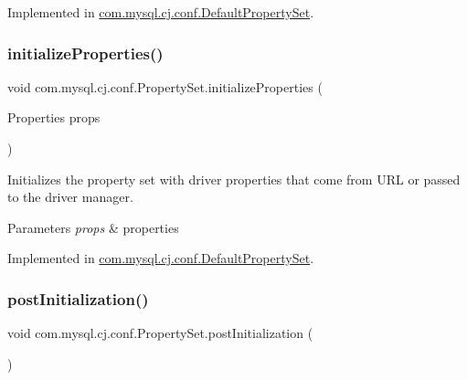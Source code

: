 Implemented in \mbox{\hyperlink{classcom_1_1mysql_1_1cj_1_1conf_1_1_default_property_set_a3eedd64227cd2e0ad94201c64992a259}{com.\+mysql.\+cj.\+conf.\+Default\+Property\+Set}}.

\mbox{\label{interfacecom_1_1mysql_1_1cj_1_1conf_1_1_property_set_a4d0959318c1dd50f8d73a4aabcacd2ae}} 
\subsubsection{\texorpdfstring{initialize\+Properties()}{initializeProperties()}}
{\footnotesize\ttfamily void com.\+mysql.\+cj.\+conf.\+Property\+Set.\+initialize\+Properties (\begin{DoxyParamCaption}\item[{Properties}]{props }\end{DoxyParamCaption})}

Initializes the property set with driver properties that come from U\+RL or passed to the driver manager.


\begin{DoxyParams}{Parameters}
{\em props} & properties \\
\hline
\end{DoxyParams}


Implemented in \mbox{\hyperlink{classcom_1_1mysql_1_1cj_1_1conf_1_1_default_property_set_aca8a98e7e0fa72d07fde37a0e7b03fbe}{com.\+mysql.\+cj.\+conf.\+Default\+Property\+Set}}.

\mbox{\label{interfacecom_1_1mysql_1_1cj_1_1conf_1_1_property_set_a1e590d8f29a11f3231099aa1c163f987}} 
\subsubsection{\texorpdfstring{post\+Initialization()}{postInitialization()}}
{\footnotesize\ttfamily void com.\+mysql.\+cj.\+conf.\+Property\+Set.\+post\+Initialization (\begin{DoxyParamCaption}{ }\end{DoxyParamCaption})}




